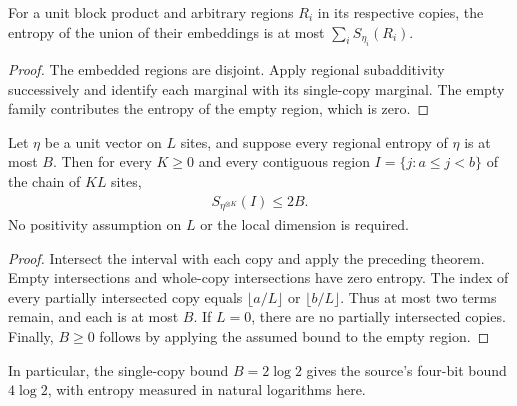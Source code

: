 \begin{lemma}
    \label{thm:chain_copy_regions_entropy_sum}
    \leanok
    For a unit block product and arbitrary regions $R_i$ in its respective
    copies, the entropy of the union of their embeddings is at most
    $\sum_i S_{\eta_i}(R_i)$.
\end{lemma}
\begin{proof}\leanok
    The embedded regions are disjoint. Apply regional subadditivity
    successively and identify each marginal with its single-copy marginal.
    The empty family contributes the entropy of the empty region, which is zero.
\end{proof}

\begin{lemma}
    \label{thm:chain_copy_interval_entropy}
    \leanok
    Let $\eta$ be a unit vector on $L$ sites, and suppose every regional
    entropy of $\eta$ is at most $B$. Then for every $K\ge0$ and every
    contiguous region $I=\{j:a\le j<b\}$ of the chain of $KL$ sites,
    \begin{align}
        \label{eq:chain_copy_interval_entropy}
        S_{\eta^{\otimes K}}(I)\le2B.
    \end{align}
    No positivity assumption on $L$ or the local dimension is required.
\end{lemma}
\begin{proof}\leanok
    Intersect the interval with each copy and apply the preceding theorem.
    Empty intersections and whole-copy intersections have zero entropy.
    The index of every partially intersected copy equals $\lfloor a/L\rfloor$ or $\lfloor b/L\rfloor$.
    Thus at most two terms remain, and each is at most $B$.
    If $L=0$, there are no partially intersected copies.
    Finally, $B\ge0$ follows by applying the assumed bound to the empty region.
\end{proof}

In particular, the single-copy bound $B=2\log2$ gives the source's
four-bit bound $4\log2$, with entropy measured in natural logarithms here.
